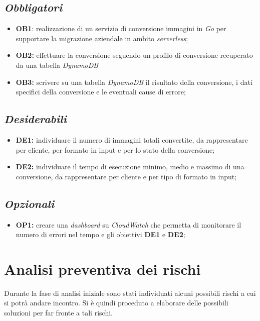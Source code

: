 \subsection*{\emph{Obbligatori}}
\begin{itemize}
    \item \textbf{OB1}: realizzazione di un servizio di conversione immagini
          in \emph{Go} per supportare la migrazione aziendale in ambito
          \emph{\glsfirstoccur\gls{serverless}};
    \item \textbf{OB2:} effettuare la conversione seguendo un profilo di
          conversione recuperato da una tabella \emph{\glsfirstoccur\gls{DynamoDB}}
    \item \textbf{OB3:} scrivere su una tabella \emph{DynamoDB} il risultato
          della conversione, i dati specifici della conversione e le eventuali cause
          di errore;
\end{itemize}
\subsection*{\emph{Desiderabili}}
\begin{itemize}
    \item \textbf{DE1:} individuare il numero di immagini totali convertite, da
          rappresentare per cliente, per formato in input e per lo stato della
          conversione;
    \item \textbf{DE2:} individuare il tempo di esecuzione minimo, medio e
          massimo di una conversione, da rappresentare per cliente e per tipo di
          formato in input;
\end{itemize}
\subsection*{\emph{Opzionali}}
\begin{itemize}
    \item \textbf{OP1:} creare una \emph{\glsfirstoccur\gls{dashboard}} su
          \emph{\glsfirstoccur\gls{CloudWatch}} che permetta di monitorare il numero
          di errori nel tempo e gli obiettivi \textbf{DE1} e \textbf{DE2};
\end{itemize}
\section{Analisi preventiva dei rischi}

Durante la fase di analisi iniziale sono stati individuati alcuni possibili rischi a cui si potrà andare incontro.
Si è quindi proceduto a elaborare delle possibili soluzioni per far fronte a tali rischi.\\

